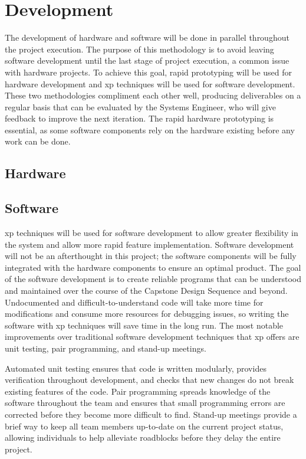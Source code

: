 \chapter{Development}
The development of hardware and software will be done in parallel throughout the project execution.
The purpose of this methodology is to avoid leaving software development until the last stage of project execution, a common issue with hardware projects. 
To achieve this goal, rapid prototyping will be used for hardware development and \gls{xp} techniques will be used for software development. 
These two methodologies compliment each other well, producing deliverables on a regular basis that can be evaluated by the Systems Engineer, who will give feedback to improve the next iteration. 
The rapid hardware prototyping is essential, as some software components rely on the hardware existing before any work can be done.
\section{Hardware}
\section{Software}
\gls{xp} techniques will be used for software development to allow greater flexibility in the system and allow more rapid feature implementation.
Software development will not be an afterthought in this project; the software components will be fully integrated with the hardware components to ensure an optimal product. 
The goal of the software development is to create reliable programs that can be understood and maintained over the course of the Capstone Design Sequence and beyond.
Undocumented and difficult-to-understand code will take more time for modifications and consume more resources for debugging issues, so writing the software with \gls{xp} techniques will save time in the long run.
The most notable improvements over traditional software development techniques that \gls{xp} offers are unit testing, pair programming, and stand-up meetings.

Automated unit testing ensures that code is written modularly, provides verification throughout development, and checks that new changes do not break existing features of the code.
Pair programming spreads knowledge of the software throughout the team and ensures that small programming errors are corrected before they become more difficult to find.
Stand-up meetings provide a brief way to keep all team members up-to-date on the current project status, allowing individuals to help alleviate roadblocks before they delay the entire project. 
